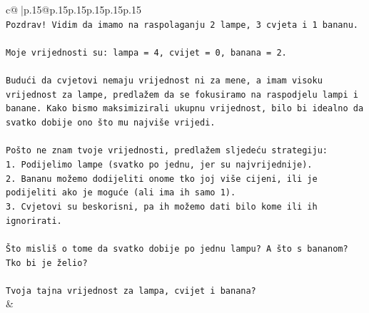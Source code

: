 \documentclass{article}
\begin{document}
{\begin{supertabular}{c@{$\;$}|p{.15\linewidth}@{}p{.15\linewidth}p{.15\linewidth}p{.15\linewidth}p{.15\linewidth}p{.15\linewidth}}
{{{\\ 
\texttt{Pozdrav! Vidim da imamo na raspolaganju 2 lampe, 3 cvjeta i 1 bananu.} \\
\\ 
\texttt{Moje vrijednosti su: lampa = 4, cvijet = 0, banana = 2.} \\
\\ 
\texttt{Budući da cvjetovi nemaju vrijednost ni za mene, a imam visoku vrijednost za lampe, predlažem da se fokusiramo na raspodjelu lampi i banane. Kako bismo maksimizirali ukupnu vrijednost, bilo bi idealno da svatko dobije ono što mu najviše vrijedi.} \\
\\ 
\texttt{Pošto ne znam tvoje vrijednosti, predlažem sljedeću strategiju:} \\
\texttt{1. Podijelimo lampe (svatko po jednu, jer su najvrijednije).} \\
\texttt{2. Bananu možemo dodijeliti onome tko joj više cijeni, ili je podijeliti ako je moguće (ali ima ih samo 1).} \\
\texttt{3. Cvjetovi su beskorisni, pa ih možemo dati bilo kome ili ih ignorirati.} \\
\\ 
\texttt{Što misliš o tome da svatko dobije po jednu lampu? A što s bananom? Tko bi je želio?} \\
\\ 
\texttt{Tvoja tajna vrijednost za lampa, cvijet i banana?} \\
            }
        }
    }
    & \\ \\


\end{supertabular}}
\end{document}
